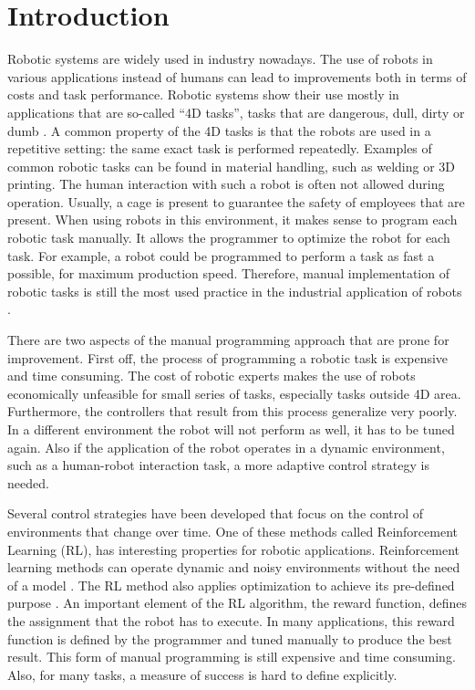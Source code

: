 \documentclass[mscThesis.tex]{subfiles}
\begin{document}
\chapter{Introduction}
\label{chap:Int}
Robotic systems are widely used in industry nowadays. The use of robots in various applications instead of humans can lead to improvements both in terms of costs and task performance. Robotic systems show their use mostly in applications that are so-called ``4D tasks'', tasks that are dangerous, dull, dirty or dumb \cite{wtec2006}. A common property of the 4D tasks is that the robots are used in a repetitive setting: the same exact task is performed repeatedly. Examples of common robotic tasks can be found in material handling, such as welding or 3D printing. The human interaction with such a robot is often not allowed during operation. Usually, a cage is present to guarantee the safety of employees that are present. When using robots in this environment, it makes sense to program each robotic task manually. It allows the programmer to optimize the robot for each task. For example, a robot could be programmed to perform a task as fast a possible, for maximum production speed. Therefore, manual implementation of robotic tasks is still the most used practice in the industrial application of robots \cite{biggs2003survey}.

There are two aspects of the manual programming approach that are prone for improvement. First off, the process of programming a robotic task is expensive and time consuming. The cost of robotic experts makes the use of robots economically unfeasible for small series of tasks, especially tasks outside 4D area. Furthermore, the controllers that result from this process generalize very poorly. In a different environment the robot will not perform as well, it has to be tuned again. Also if the application of the robot operates in a dynamic environment, such as a human-robot interaction task, a more adaptive control strategy is needed.

Several control strategies have been developed that focus on the control of environments that change over time. One of these methods called Reinforcement Learning (RL), has interesting properties for robotic applications. Reinforcement learning methods can operate dynamic and noisy environments without the need of a model \cite{SuttonBarto1998}. The RL method also applies optimization to achieve its pre-defined purpose \cite{Lewis2009}. An important element of the RL algorithm, the reward function, defines the assignment that the robot has to execute. In many applications, this reward function is defined by the programmer and tuned manually to produce the best result. This form of manual programming is still expensive and time consuming. Also, for many tasks, a measure of success is hard to define explicitly. 
\end{document}
